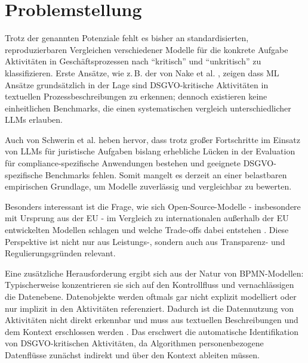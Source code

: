 \section{Problemstellung}\label{sec:problemstellung}

Trotz der genannten Potenziale fehlt es bisher an standardisierten, reproduzierbaren Vergleichen verschiedener Modelle für die konkrete Aufgabe Aktivitäten in Geschäftsprozessen nach \enquote{kritisch} und \enquote{unkritisch} zu klassifizieren. Erste Ansätze, wie z.\,B. der von Nake et al. \cite{nake2023towards}, zeigen dass ML Ansätze grundsätzlich in der Lage sind \ac{DSGVO}-kritische Aktivitäten in textuellen Prozessbeschreibungen zu erkennen; dennoch existieren keine einheitlichen Benchmarks, die einen systematischen vergleich unterschiedlicher \acp{LLM} erlauben.

Auch von Schwerin et al. \cite{schwerin2024systematic} heben hervor, dass trotz großer Fortschritte im Einsatz von \acp{LLM} für juristische Aufgaben bislang erhebliche Lücken in der Evaluation für compliance-spezifische Anwendungen bestehen und geeignete \ac{DSGVO}-spezifische Benchmarks fehlen. Somit mangelt es derzeit an einer belastbaren empirischen Grundlage, um Modelle zuverlässig und vergleichbar zu bewerten.

Besonders interessant ist die Frage, wie sich Open-Source-Modelle - insbesondere mit Ursprung aus der \ac{EU} - im Vergleich zu internationalen außerhalb der \ac{EU} entwickelten Modellen schlagen und welche Trade-offs dabei entstehen \cite{schwerin2024systematic}. Diese Perspektive ist nicht nur aus Leistungs-, sondern auch aus Transparenz- und Regulierungsgründen relevant.

Eine zusätzliche Herausforderung ergibt sich aus der Natur von \ac{BPMN}-Modellen: Typischerweise konzentrieren sie sich auf den Kontrollfluss und vernachlässigen die Datenebene. Datenobjekte werden oftmals gar nicht explizit modelliert oder nur implizit in den Aktivitäten referenziert. Dadurch ist die Datennutzung von Aktivitäten nicht direkt erkennbar und muss aus textuellen Beschreibungen und dem Kontext erschlossen werden \cite{schneid2021uncovering}. Das erschwert die automatische Identifikation von \ac{DSGVO}-kritischen Aktivitäten, da Algorithmen personenbezogene Datenflüsse zunächst indirekt und über den Kontext ableiten müssen.